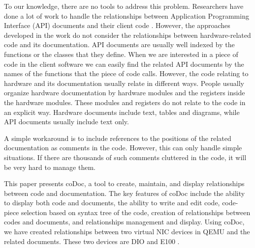 \documentclass[conference]{IEEEtran}
\begin{document}
To our knowledge, there are no tools to address this problem.
Researchers have done a lot of work to handle the relationships between Application Programming Interface (API) documents and their client code \cite{Pandita_inferring_2012} \cite{wei_inferring_2011}.
However, the approaches developed in the work do not consider the relationships between hardware-related code and its documentation.
API documents are usually well indexed by the functions or the classes that they define.
When we are interested in a piece of code in the client software
we can easily find the related API documents by the names of the functions that the piece of code calls.
However, the code relating to hardware and its documentation usually relate in different ways.
People usually organize hardware documentation by hardware modules and the registers inside the hardware modules.
These modules and registers do not relate to the code in an explicit way.
Hardware documents include text, tables and diagrams, while API documents usually include text only.

A simple workaround is to include references to the positions of the related documentation as comments in the code.
However, this can only handle simple situations.
If there are thousands of such comments cluttered in the code,
it will be very hard to manage them.

This paper presents coDoc, a tool to create, maintain, and display relationships between code and documentation.
The key features of coDoc include 
the ability to display both code and documents, 
the ability to write and edit code, 
code-piece selection based on syntax tree of the code,
creation of relationships between codes and documents,
and relationships management and display.
Using coDoc, we have created relationships between two virtual NIC devices in QEMU and the related documents.
These two devices are DIO \cite{dio} and E100 \cite{e100}.
\end{document}
